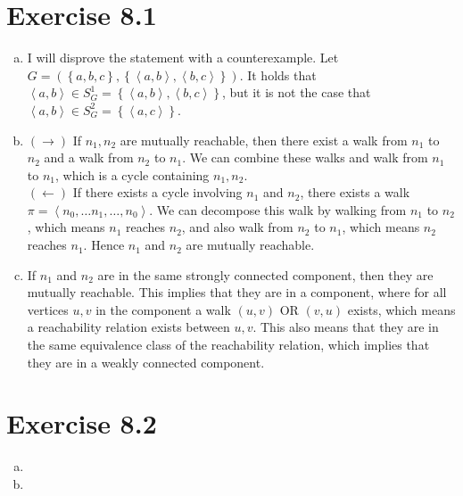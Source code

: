 \documentclass{article} %
\newcommand{\homeworkNumber}{8}
\begin{document}
\section*{Exercise \homeworkNumber.1}

\begin{enumerate}[(a)]
	\item I will disprove the statement with a counterexample. Let \( G = (\left\{ a,b,c \right\}, \left\{ \left< a,b \right>, \left< b,c \right>\right\} )  \). It holds that \( \left< a,b \right> \in S_{G}^{1} = \left\{ \left< a,b \right>, \left< b,c \right> \right\} \), but it is not the case that \( \left< a,b \right> \in S_{G}^{2} = \left\{ \left< a,c \right> \right\}  \).
	\item \( (\rightarrow) \) If \( n_{1}, n_{2} \) are mutually reachable, then there exist a walk from \( n_{1} \) to \( n_{2} \) and a walk from \( n_{2} \) to \( n_{1} \). We can combine these walks and walk from \( n_{1} \) to \( n_{1} \), which is a cycle containing \( n_{1},n_{2} \). \\
	      \( (\leftarrow) \) If there exists a cycle involving \( n_{1} \) and \( n_{2} \), there exists a walk \( \pi = \left< n_{0},\ldots n_{1},\ldots ,n_{0} \right> \). We can decompose this walk by walking from \( n_{1} \) to \( n_{2} \), which means \( n_{1} \) reaches \( n_{2} \), and also walk from \( n_{2} \) to \( n_{1} \), which means \( n_{2} \) reaches \( n_{1} \). Hence \( n_{1} \) and \( n_{2} \) are mutually reachable.
	\item If \( n_{1} \) and \( n_{2} \) are in the same strongly connected component, then they are mutually reachable. This implies that they are in a component, where for all vertices \( u,v \) in the component a walk \( (u,v) \) OR \( (v,u) \) exists, which means a reachability relation exists between \( u,v \). This also means that they are in the same equivalence class of the reachability relation, which implies that they are in a weakly connected component.
\end{enumerate}



\section*{Exercise \homeworkNumber.2}

\begin{enumerate}[(a)]
	\item
	\item
\end{enumerate}
\end{document}
